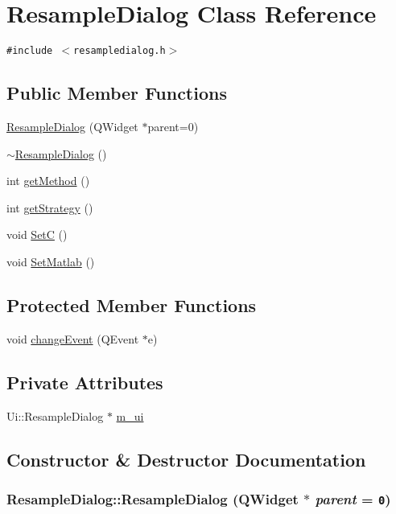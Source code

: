 \hypertarget{class_resample_dialog}{
\section{ResampleDialog Class Reference}
\label{class_resample_dialog}
}
{\tt \#include $<$resampledialog.h$>$}

\subsection*{Public Member Functions}
\begin{CompactItemize}
\item 
\hyperlink{class_resample_dialog_5df218868b4b19a752afc033e032528d}{ResampleDialog} (QWidget $\ast$parent=0)
\item 
\hyperlink{class_resample_dialog_4204be68cd651114d94661717030b0bc}{$\sim$ResampleDialog} ()
\item 
int \hyperlink{class_resample_dialog_e7747ae10c66293869739f44ea4a0f2c}{getMethod} ()
\item 
int \hyperlink{class_resample_dialog_044ce1050b00f3dd2eaf16fd4d45cc1d}{getStrategy} ()
\item 
void \hyperlink{class_resample_dialog_053a45a8f7d332572185b155185a6c60}{SetC} ()
\item 
void \hyperlink{class_resample_dialog_6d2ca68cedde02add245d148ba1a400c}{SetMatlab} ()
\end{CompactItemize}
\subsection*{Protected Member Functions}
\begin{CompactItemize}
\item 
void \hyperlink{class_resample_dialog_823a4e6d2b903ccb12c0ec31d4728344}{changeEvent} (QEvent $\ast$e)
\end{CompactItemize}
\subsection*{Private Attributes}
\begin{CompactItemize}
\item 
Ui::ResampleDialog $\ast$ \hyperlink{class_resample_dialog_c28f426397a6f6a7961dfced930a56cb}{m\_\-ui}
\end{CompactItemize}


\subsection{Constructor \& Destructor Documentation}
\hypertarget{class_resample_dialog_5df218868b4b19a752afc033e032528d}{
\subsubsection[{ResampleDialog}]{\setlength{\rightskip}{0pt plus 5cm}ResampleDialog::ResampleDialog (QWidget $\ast$ {\em parent} = {\tt 0})}}
\label{class_resample_dialog_5df218868b4b19a752afc033e032528d}


